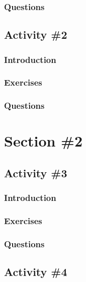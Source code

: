       \subsubsection{Questions}

    \subsection{Activity \#2}
      \subsubsection{Introduction}
      \subsubsection{Exercises}
      \subsubsection{Questions}

  \pagebreak

  \section{Section \#2} %
    \subsection{Activity \#3}
      \subsubsection{Introduction}
      \subsubsection{Exercises}    
      \subsubsection{Questions}

    \subsection{Activity \#4}
